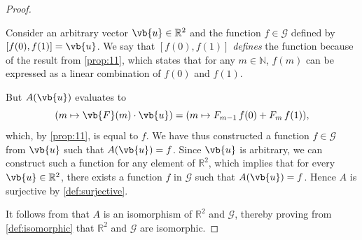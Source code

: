 \begin{enumerate}
\begin{enumerate}
\begin{proof}
\begin{subproof}
                        Consider an arbitrary vector $\vb{u} \in \mathbb{R}^2$ and the function $f \in \mathscr{G}$ defined by $[f(0), f(1)] = \vb{u}$.
                        We say that $[f(0), f(1)]$ \emph{defines} the function because of the result from \cref{prop:11},
                        which states that for any $m \in \mathbb{N}$, $f(m)$ can be expressed as a linear combination of $f(0)$ and $f(1)$.

                        \smallskip

                        But $A(\vb{u})$ evaluates to
                        \[
                            (m \mapsto \vb{F}(m) \cdot \vb{u}) = (m \mapsto F_{m - 1} \, f(0) + F_m \, f(1)),
                        \]
                        which, by \cref{prop:11}, is equal to $f$. We have thus constructed a function $f \in \mathscr{G}$ from $\vb{u}$ such that $A(\vb{u}) = f$. Since $\vb{u}$ is arbitrary, we can construct such a function for any element of $\mathbb{R}^2$, which implies that for every $\vb{u} \in \mathbb{R}^2$, there exists a function $f$ in $\mathscr{G}$ such that $A(\vb{u}) = f$. Hence $A$ is surjective by \cref{def:surjective}.
                    \end{subproof}

                    \bigskip

                    It follows from  that $A$ is an isomorphism of $\mathbb{R}^2$ and $\mathscr{G}$, thereby proving from \cref{def:isomorphic} that $\mathbb{R}^2$ and $\mathscr{G}$ are isomorphic.
                \end{proof}

        \end{enumerate}

\end{enumerate}
